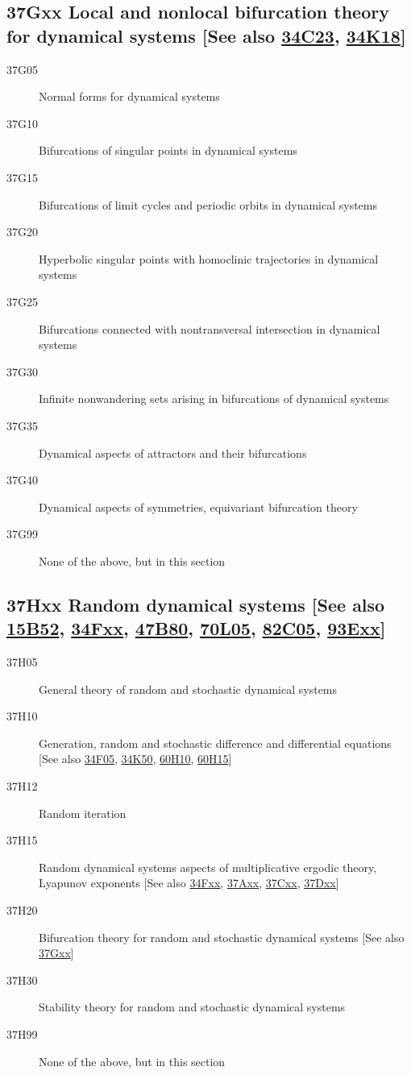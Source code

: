 \subsection*{37Gxx  Local and nonlocal bifurcation theory for dynamical systems [See also \hyperref[34C23]{34C23}, \hyperref[34K18]{34K18}] }\label{37Gxx}
\begin{description}  
\item [37G05]\label{37G05} Normal forms for dynamical systems
\item [37G10]\label{37G10} Bifurcations of singular points in dynamical systems
\item [37G15]\label{37G15} Bifurcations of limit cycles and periodic orbits in dynamical systems
\item [37G20]\label{37G20} Hyperbolic singular points with homoclinic trajectories in dynamical systems
\item [37G25]\label{37G25} Bifurcations connected with nontransversal intersection in dynamical systems
\item [37G30]\label{37G30} Infinite nonwandering sets arising in bifurcations of dynamical systems
\item [37G35]\label{37G35} Dynamical  aspects of attractors and their bifurcations 
\item [37G40]\label{37G40} Dynamical  aspects of symmetries, equivariant bifurcation theory
\item [37G99]\label{37G99} None of the above, but in this section
\end{description}
\subsection*{37Hxx  Random dynamical systems [See also \hyperref[15B52]{15B52}, \hyperref[34Fxx]{34Fxx}, \hyperref[47B80]{47B80}, \hyperref[70L05]{70L05}, \hyperref[82C05]{82C05}, \hyperref[93Exx]{93Exx}] }\label{37Hxx}
\begin{description} 
\item [37H05]\label{37H05} General theory of random and stochastic dynamical systems 
\item [37H10]\label{37H10} Generation, random and stochastic difference and differential equations [See also \hyperref[34F05]{34F05}, \hyperref[34K50]{34K50}, \hyperref[60H10]{60H10}, \hyperref[60H15]{60H15}]
\item [37H12]\label{37H12} Random iteration 
\item [37H15]\label{37H15} Random dynamical systems aspects of multiplicative ergodic theory, Lyapunov exponents [See also \hyperref[34Fxx]{34Fxx}, \hyperref[37Axx]{37Axx}, \hyperref[37Cxx]{37Cxx}, \hyperref[37Dxx]{37Dxx}]
\item [37H20]\label{37H20} Bifurcation theory for random and stochastic dynamical systems [See also \hyperref[37Gxx]{37Gxx}]
\item [37H30]\label{37H30} Stability theory  for random and stochastic dynamical systems 
\item [37H99]\label{37H99} None of the above, but in this section
\end{description}
